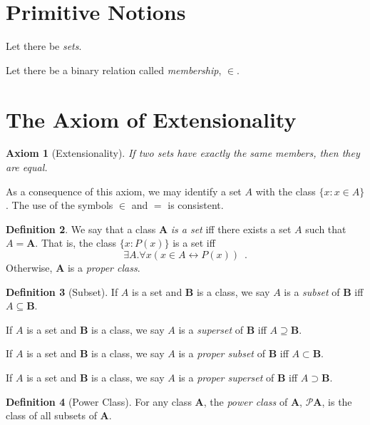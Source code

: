 \documentclass{report}
\newtheorem{axiom}{Axiom}[section]
\theoremstyle{definition}
\newtheorem{definition}[axiom]{Definition}
\begin{document}
    \section{Primitive Notions}

    Let there be \emph{sets}.

    Let there be a binary relation called \emph{membership}, $\in$. 
    
    \section{The Axiom of Extensionality}

    \begin{axiom}[Extensionality]
        If two sets have exactly the same members, then they are equal.
    \end{axiom}

    As a consequence of this axiom, we may identify a set $A$ with the class $\{ x : x \in A \}$. The use of
    the symbols $\in$ and $=$ is consistent.

    \begin{definition}
        We say that a class $\mathbf{A}$ \emph{is a set} iff there exists a set $A$ such that $A = \mathbf{A}$.
        That is, the class $\{ x : P(x) \}$ is a set iff
        \[ \exists A. \forall x (x \in A \leftrightarrow P(x)) \enspace . \]
        Otherwise, $\mathbf{A}$ is a \emph{proper class}.
    \end{definition}

    \begin{definition}[Subset]
        If $A$ is a set and $\mathbf{B}$ is a class, we say $A$ is a \emph{subset} of $\mathbf{B}$
        iff $A \subseteq \mathbf{B}$.

        If $A$ is a set and $\mathbf{B}$ is a class, we say $A$ is a \emph{superset} of $\mathbf{B}$
        iff $A \supseteq \mathbf{B}$.

        If $A$ is a set and $\mathbf{B}$ is a class, we say $A$ is a \emph{proper subset} of $\mathbf{B}$
        iff $A \subset \mathbf{B}$. 
        
        If $A$ is a set and $\mathbf{B}$ is a class, we say $A$ is a \emph{proper superset} of $\mathbf{B}$
        iff $A \supset \mathbf{B}$.
    \end{definition}

    \begin{definition}[Power Class]
        For any class $\mathbf{A}$, the \emph{power class} of $\mathbf{A}$, $\mathcal{P} \mathbf{A}$, is the class of all subsets of 
        $\mathbf{A}$.
    \end{definition}
\end{document}
